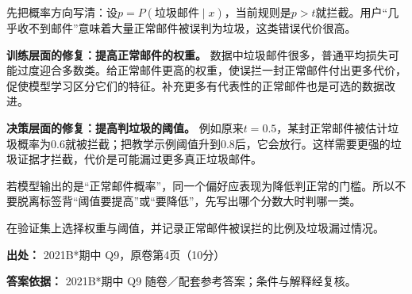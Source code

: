 先把概率方向写清：设\(p=P(\text{垃圾邮件}\mid x)\)，当前规则是\(p>t\)就拦截。用户“几乎收不到邮件”意味着大量正常邮件被误判为垃圾，这类错误代价很高。


\textbf{训练层面的修复：提高正常邮件的权重。} 数据中垃圾邮件很多，普通平均损失可能过度迎合多数类。给正常邮件更高的权重，使误拦一封正常邮件付出更多代价，促使模型学习区分它们的特征。补充更多有代表性的正常邮件也是可选的数据改进。


\textbf{决策层面的修复：提高判垃圾的阈值。} 例如原来\(t=0.5\)，某封正常邮件被估计垃圾概率为0.6就被拦截；把教学示例阈值升到0.8后，它会放行。这样需要更强的垃圾证据才拦截，代价是可能漏过更多真正垃圾邮件。


若模型输出的是“正常邮件概率”，同一个偏好应表现为降低判正常的门槛。所以不要脱离标签背“阈值要提高”或“要降低”，先写出哪个分数大时判哪一类。


在验证集上选择权重与阈值，并记录正常邮件被误拦的比例及垃圾漏过情况。


\textbf{出处：} 2021B*期中 Q9，原卷第4页（10分）


\textbf{答案依据：} 2021B*期中 Q9 随卷／配套参考答案；条件与解释经复核。
